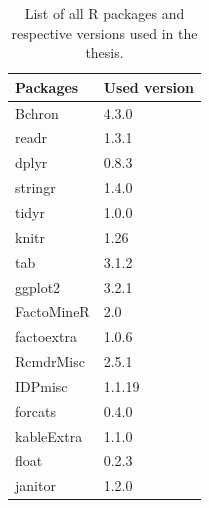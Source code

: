 \documentclass[12pt,twoside]{reedthesis}
\begin{document}
\begin{table}

\caption{\label{tab:unnamed-chunk-54}List of all R packages and respective versions used in the thesis.}
\centering
\begin{tabular}[t]{ll}
\toprule
Packages & Used version\\
\midrule
Bchron & 4.3.0\\
readr & 1.3.1\\
dplyr & 0.8.3\\
stringr & 1.4.0\\
tidyr & 1.0.0\\
\addlinespace
knitr & 1.26\\
tab & 3.1.2\\
ggplot2 & 3.2.1\\
FactoMineR & 2.0\\
factoextra & 1.0.6\\
\addlinespace
RcmdrMisc & 2.5.1\\
IDPmisc & 1.1.19\\
forcats & 0.4.0\\
kableExtra & 1.1.0\\
float & 0.2.3\\
\addlinespace
janitor & 1.2.0\\
\bottomrule
\end{tabular}
\end{table}
\end{document}
